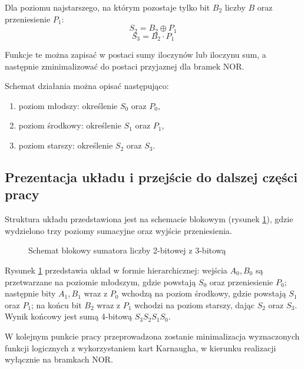 \documentclass[11pt]{article}
\begin{document}
Dla poziomu najstarszego, na którym pozostaje tylko bit \(B_2\) liczby \(B\) oraz przeniesienie \(P_1\):
\begin{equation}
S_2 = B_2 \oplus P_1
\end{equation}
\begin{equation}
S_3 = B_2 \cdot P_1
\end{equation}

Funkcje te można zapisać w postaci sumy iloczynów lub iloczynu sum, a następnie zminimalizować do postaci przyjaznej dla bramek NOR.

Schemat działania można opisać następująco:
\begin{enumerate}
    \item poziom młodszy: określenie \(S_0\) oraz \(P_0\),
    \item poziom środkowy: określenie \(S_1\) oraz \(P_1\),
    \item poziom starszy: określenie \(S_2\) oraz \(S_3\).
\end{enumerate}

\subsection{Prezentacja układu i przejście do dalszej części pracy}

Struktura układu przedstawiona jest na schemacie blokowym (rysunek \ref{fig:schemat_bloku2}), gdzie wydzielono trzy poziomy sumacyjne oraz wyjście przeniesienia.

\begin{figure}[H]
\centering
\resizebox{0.9\linewidth}{!}{\RysSchematBlokowy}
\caption{Schemat blokowy sumatora liczby 2-bitowej z 3-bitową}
\label{fig:schemat_bloku2}
\end{figure}

Rysunek \ref{fig:schemat_bloku2} przedstawia układ w formie hierarchicznej: wejścia \(A_0, B_0\) są przetwarzane na poziomie młodszym, gdzie powstają \(S_0\) oraz przeniesienie \(P_0\); następnie bity \(A_1, B_1\) wraz z \(P_0\) wchodzą na poziom środkowy, gdzie powstają \(S_1\) oraz \(P_1\); na końcu bit \(B_2\) wraz z \(P_1\) wchodzi na poziom starszy, dając \(S_2\) oraz \(S_3\). Wynik końcowy jest sumą 4-bitową \(S_3 S_2 S_1 S_0\).

W kolejnym punkcie pracy przeprowadzona zostanie minimalizacja wyznaczonych funkcji logicznych z wykorzystaniem kart Karnaugha, w kierunku realizacji wyłącznie na bramkach NOR.
\end{document}
